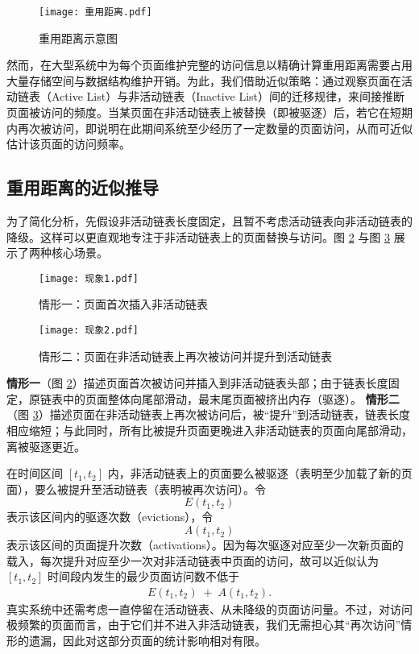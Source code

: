 \begin{figure}[htbp]
  \centering
  \texttt{[image: 重用距离.pdf]}
  \caption{重用距离示意图}
  \label{fig:refault_distance}
\end{figure}

然而，在大型系统中为每个页面维护完整的访问信息以精确计算重用距离需要占用大量存储空间与数据结构维护开销。为此，我们借助近似策略：通过观察页面在活动链表（Active List）与非活动链表（Inactive List）间的迁移规律，来间接推断页面被访问的频度。当某页面在非活动链表上被替换（即被驱逐）后，若它在短期内再次被访问，即说明在此期间系统至少经历了一定数量的页面访问，从而可近似估计该页面的访问频率。


\subsection{重用距离的近似推导}

为了简化分析，先假设非活动链表长度固定，且暂不考虑活动链表向非活动链表的降级。这样可以更直观地专注于非活动链表上的页面替换与访问。图 \ref{fig:现象1} 与图 \ref{fig:现象2} 展示了两种核心场景。

\begin{figure}[htbp]
  \centering
  \texttt{[image: 现象1.pdf]}
  \caption{情形一：页面首次插入非活动链表}
  \label{fig:现象1}
\end{figure}

\begin{figure}[htbp]
  \centering
  \texttt{[image: 现象2.pdf]}
  \caption{情形二：页面在非活动链表上再次被访问并提升到活动链表}
  \label{fig:现象2}
\end{figure}

\noindent
\textbf{情形一}（图 \ref{fig:现象1}）描述页面首次被访问并插入到非活动链表头部；由于链表长度固定，原链表中的页面整体向尾部滑动，最末尾页面被挤出内存（驱逐）。  
\textbf{情形二}（图 \ref{fig:现象2}）描述页面在非活动链表上再次被访问后，被“提升”到活动链表，链表长度相应缩短；与此同时，所有比被提升页面更晚进入非活动链表的页面向尾部滑动，离被驱逐更近。

在时间区间 \([t_1, t_2]\) 内，非活动链表上的页面要么被驱逐（表明至少加载了新的页面），要么被提升至活动链表（表明被再次访问）。令
\[
  E(t_1,t_2)
\]
表示该区间内的驱逐次数（evictions），令
\[
  A(t_1,t_2)
\]
表示该区间的页面提升次数（activations）。因为每次驱逐对应至少一次新页面的载入，每次提升对应至少一次对非活动链表中页面的访问，故可以近似认为 \([t_1,t_2]\) 时间段内发生的最少页面访问数不低于
\begin{align}
  \label{eq:e_plus_a}
  E(t_1,t_2) \;+\; A(t_1,t_2).
\end{align}
真实系统中还需考虑一直停留在活动链表、从未降级的页面访问量。不过，对访问极频繁的页面而言，由于它们并不进入非活动链表，我们无需担心其“再次访问”情形的遗漏，因此对这部分页面的统计影响相对有限。


